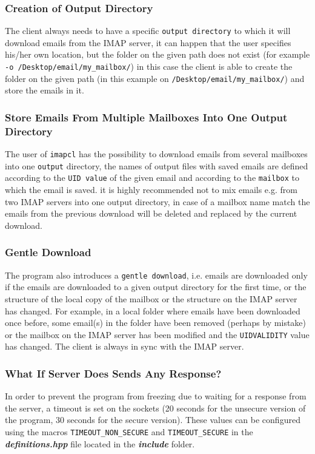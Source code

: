 \documentclass[a4paper,11pt]{article}
\begin{document}
\subsubsection{Creation of Output Directory}
The client always needs to have a specific \verb!output directory! to which it will download emails 
from the IMAP server, it can happen that the user specifies his/her own location, but the 
folder on the given path does not exist (for example \verb!-o /Desktop/email/my_mailbox/!) in 
this case the client is able to create the folder on the given path 
(in this example on \verb!/Desktop/email/my_mailbox/!) and store the emails in it.

\subsubsection{Store Emails From Multiple Mailboxes Into One Output Directory}
The user of \verb!imapcl! has the possibility to download emails from several mailboxes 
into one \verb!output! directory, the names of output files with saved emails are defined 
according to the \verb!UID value! of the given email and according to the \verb!mailbox! 
to which the email is saved. it is highly recommended not to mix emails e.g. from two IMAP 
servers into one output directory, in case of a mailbox name match the emails from the previous 
download will be deleted and replaced by the current download.

\subsubsection{Gentle Download}
The program also introduces a \verb!gentle download!, i.e. emails are downloaded only if the 
emails are downloaded to a given output directory for the first time, or the structure of 
the local copy of the mailbox or the structure on the IMAP server has changed. For example, 
in a local folder where emails have been downloaded once before, some email(s) in the folder 
have been removed (perhaps by mistake) or the mailbox on the IMAP server has been modified 
and the \verb!UIDVALIDITY! value has changed. The client is always in sync with the IMAP server.

\subsubsection{What If Server Does Sends Any Response?}
In order to prevent the program from freezing due to waiting for a response from the server, 
a timeout is set on the sockets (20 seconds for the unsecure version of the program, 
30 seconds for the secure version). These values can be configured using the macros 
\verb!TIMEOUT_NON_SECURE! and \verb!TIMEOUT_SECURE! in the \textbf{\textit{definitions.hpp}} 
file located in the \textbf{\textit{include}} folder.
\end{document}
